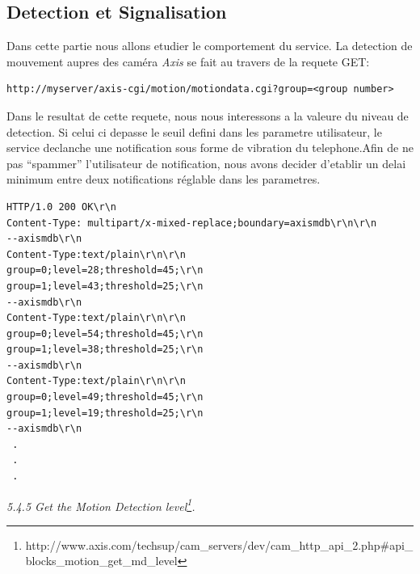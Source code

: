 \subsection{Detection et Signalisation}
Dans cette partie nous allons etudier le comportement du service.
La detection de mouvement aupres des caméra \textit{Axis} se fait au travers de
la requete GET: 
\begin{lstlisting}
http://myserver/axis-cgi/motion/motiondata.cgi?group=<group number>
\end{lstlisting}
Dans le resultat de cette requete, nous nous interessons a la valeure du niveau
de detection. Si celui ci depasse le seuil defini dans les parametre
utilisateur, le service declanche une notification sous forme de vibration du
telephone.\newline Afin de ne pas ``spammer'' l'utilisateur de notification,
nous avons decider d'etablir un delai minimum entre deux notifications réglable
dans les parametres.
\begin{lstlisting}
HTTP/1.0 200 OK\r\n
Content-Type: multipart/x-mixed-replace;boundary=axismdb\r\n\r\n
--axismdb\r\n
Content-Type:text/plain\r\n\r\n
group=0;level=28;threshold=45;\r\n
group=1;level=43;threshold=25;\r\n
--axismdb\r\n
Content-Type:text/plain\r\n\r\n
group=0;level=54;threshold=45;\r\n
group=1;level=38;threshold=25;\r\n
--axismdb\r\n
Content-Type:text/plain\r\n\r\n
group=0;level=49;threshold=45;\r\n
group=1;level=19;threshold=25;\r\n
--axismdb\r\n
 .
 .
 . 
\end{lstlisting}
\textit{5.4.5 Get the Motion Detection
level\footnote{\label{MotionDetectionDoc}
http://www.axis.com/techsup/cam\_servers/dev/cam\_http\_api\_2.php\#api\_blocks\_motion\_get\_md\_level}.}


